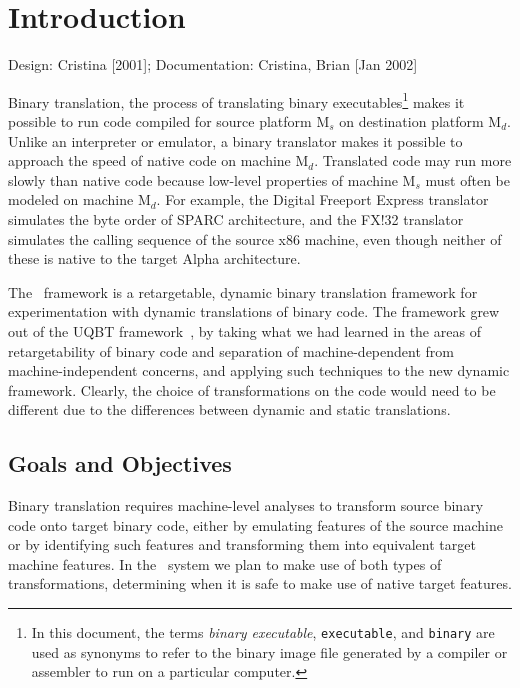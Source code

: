\chapter{Introduction}
\label{ch-intro}

{\small
\begin{flushright}
Design: Cristina [2001]; Documentation: Cristina, Brian [Jan 2002]
\end{flushright}
}


Binary translation, the process of translating binary executables\footnote{
In this document, the terms \emph{binary executable}, \texttt{executable},
and \texttt{binary} are used as synonyms to refer to the binary image
file generated by a compiler or assembler to run on a particular
computer.
} makes it possible to run code compiled for source
platform M$_s$ on destination platform M$_d$.  Unlike an interpreter or
emulator, a binary translator makes it possible to approach the speed
of native code on machine M$_d$.  Translated code may run more slowly than
native code because low-level properties of machine M$_s$ must often be
modeled on machine M$_d$.  For example, the Digital Freeport Express
translator~\cite{Dec95} simulates the byte order of SPARC architecture, 
and the FX!32 translator~\cite{Thom96,Hook97} simulates the calling sequence 
of the source x86 machine, even though neither of these is native to the 
target Alpha architecture.

The \walk\ framework is a retargetable, dynamic binary translation framework 
for experimentation with dynamic translations of binary code.  
The framework grew out of the UQBT framework~\cite{Cifu00e,Cifu01e,Cifu01f}, 
by taking what we had learned in the areas of retargetability of binary code 
and separation of machine-dependent from machine-independent concerns, and 
applying such techniques to the new dynamic framework.  Clearly, the choice of
transformations on the code would need to be different due to the differences
between dynamic and static translations.  


\section{Goals and Objectives}

Binary translation requires machine-level analyses to transform 
source binary code onto target binary code, either by emulating 
features of the source machine or by identifying such features and 
transforming them into equivalent target machine features. 
In the \walk\ system we plan to make use of both types of transformations, 
determining when it is safe to make use of native target features. 

